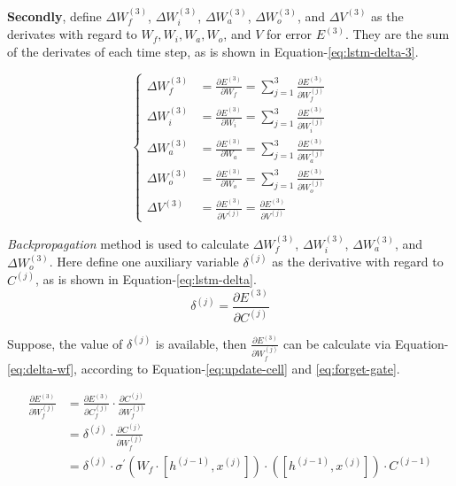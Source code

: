 \documentclass{article}
\begin{document}
\textbf{Secondly}, define $\Delta W^{(3)}_f$,  $\Delta W^{(3)}_i$, $\Delta W^{(3)}_a$, $\Delta W^{(3)}_o$, and $\Delta V^{(3)}$ 
as the derivates with regard to $W_f, W_i, W_a, W_o$,  and $V$ for error $E^{(3)}$. They are the sum of the derivates of each time step, as is shown in Equation-\ref{eq:lstm-delta-3}.


\begin{equation}\label{eq:lstm-delta-3}\begin{cases}
\Delta W^{(3)}_f &= \frac{\partial E^{(3)}}{\partial W_f} = {\sum\limits_{j=1}^3}\frac{\partial E^{(3)}}{\partial W^{(j)}_f} \\
\Delta W^{(3)}_i &= \frac{\partial E^{(3)}}{\partial W_i} = {\sum\limits_{j=1}^3}\frac{\partial E^{(3)}}{\partial W^{(j)}_i} \\
\Delta W^{(3)}_a &= \frac{\partial E^{(3)}}{\partial W_a} = {\sum\limits_{j=1}^3}\frac{\partial E^{(3)}}{\partial W^{(j)}_a} \\
\Delta W^{(3)}_o &= \frac{\partial E^{(3)}}{\partial W_o} = {\sum\limits_{j=1}^3}\frac{\partial E^{(3)}}{\partial W^{(j)}_o} \\
\Delta V^{(3)} &=\frac{\partial E^{(3)}}{\partial V^{(j)}} = \frac{\partial E^{(3)}}{\partial V^{(j)} }
\end{cases}\end{equation}

\textit{Backpropagation} method is used to calculate $\Delta W^{(3)}_f$,  $\Delta W^{(3)}_i$, $\Delta W^{(3)}_a$, and $\Delta W^{(3)}_o$. Here define one auxiliary variable $\delta^{(j)}$ as the derivative with regard to $C^{(j)}$, as is shown in Equation-\ref{eq:lstm-delta}. 
\begin{equation}\label{eq:lstm-delta}
\delta^{(j)} = \frac{\partial E^{(3)}}{\partial C^{(j)}}
\end{equation}

Suppose, the value of $\delta^{(j)}$  is available, then $\frac{\partial E^{(3)}}{\partial W^{(j)}_f}$ can be calculate via Equation-\ref{eq:delta-wf}, according to Equation-\ref{eq:update-cell} and \ref{eq:forget-gate}. 

\begin{equation}\label{eq:delta-wf}
\begin{split}
\frac{\partial E^{(3)}}{\partial W^{(j)}_f} &= \frac{\partial E^{(3)}}{\partial C^{(j)}_f} \cdot \frac{\partial C^{(j)}}{\partial W^{(j)}_f}  \\                                                       
                                                             &= \delta^{(j)} \cdot \frac{\partial C^{(j)}}{\partial W^{(j)}_f} \\
   &= \delta^{(j)} \cdot  \sigma^{\prime}(W_f \cdot [h^{(j-1)}, x^{(j)}]) \cdot ([h^{(j-1)}, x^{(j)}]) \cdot C^{(j-1)}  \\
\end{split}                                                             
\end{equation}
\end{document}
